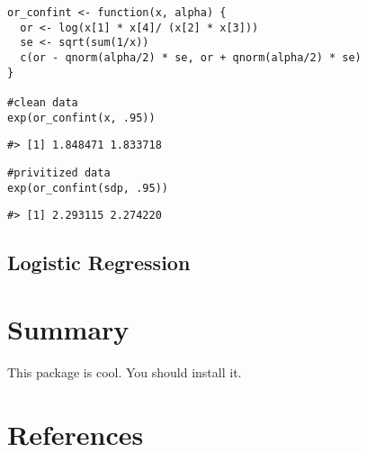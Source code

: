 \begin{verbatim}
or_confint <- function(x, alpha) {
  or <- log(x[1] * x[4]/ (x[2] * x[3]))
  se <- sqrt(sum(1/x))
  c(or - qnorm(alpha/2) * se, or + qnorm(alpha/2) * se)
}

#clean data
exp(or_confint(x, .95))
\end{verbatim}

\begin{verbatim}
#> [1] 1.848471 1.833718
\end{verbatim}

\begin{verbatim}
#privitized data
exp(or_confint(sdp, .95))
\end{verbatim}

\begin{verbatim}
#> [1] 2.293115 2.274220
\end{verbatim}

\hypertarget{logistic-regression}{%
\subsection{Logistic Regression}\label{logistic-regression}}

\hypertarget{summary}{%
\section{Summary}\label{summary}}

This package is cool. You should install it.

\hypertarget{references}{%
\section*{References}\label{references}}

